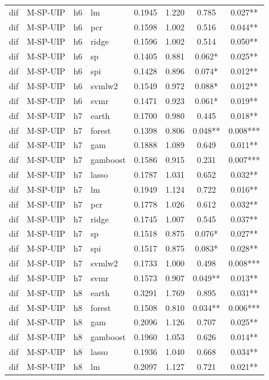 \begin{ThreePartTable}
\begin{longtable}[t]{llclcccc}
dif & M-SP-UIP & h6 & lm & 0.1945 & 1.220 & 0.785 & 0.027**\\
dif & M-SP-UIP & h6 & pcr & 0.1598 & 1.002 & 0.516 & 0.044**\\
dif & M-SP-UIP & h6 & ridge & 0.1596 & 1.002 & 0.514 & 0.050**\\
dif & M-SP-UIP & h6 & sp & 0.1405 & 0.881 & 0.062* & 0.025**\\
dif & M-SP-UIP & h6 & spi & 0.1428 & 0.896 & 0.074* & 0.012**\\
dif & M-SP-UIP & h6 & svmlw2 & 0.1549 & 0.972 & 0.088* & 0.012**\\
dif & M-SP-UIP & h6 & svmr & 0.1471 & 0.923 & 0.061* & 0.019**\\
\addlinespace
dif & M-SP-UIP & h7 & earth & 0.1700 & 0.980 & 0.445 & 0.018**\\
dif & M-SP-UIP & h7 & forest & 0.1398 & 0.806 & 0.048** & 0.008***\\
dif & M-SP-UIP & h7 & gam & 0.1888 & 1.089 & 0.649 & 0.011**\\
dif & M-SP-UIP & h7 & gamboost & 0.1586 & 0.915 & 0.231 & 0.007***\\
dif & M-SP-UIP & h7 & lasso & 0.1787 & 1.031 & 0.652 & 0.032**\\
dif & M-SP-UIP & h7 & lm & 0.1949 & 1.124 & 0.722 & 0.016**\\
dif & M-SP-UIP & h7 & pcr & 0.1778 & 1.026 & 0.612 & 0.032**\\
dif & M-SP-UIP & h7 & ridge & 0.1745 & 1.007 & 0.545 & 0.037**\\
dif & M-SP-UIP & h7 & sp & 0.1518 & 0.875 & 0.076* & 0.027**\\
dif & M-SP-UIP & h7 & spi & 0.1517 & 0.875 & 0.083* & 0.028**\\
dif & M-SP-UIP & h7 & svmlw2 & 0.1733 & 1.000 & 0.498 & 0.008***\\
dif & M-SP-UIP & h7 & svmr & 0.1573 & 0.907 & 0.049** & 0.013**\\
\addlinespace
dif & M-SP-UIP & h8 & earth & 0.3291 & 1.769 & 0.895 & 0.031**\\
dif & M-SP-UIP & h8 & forest & 0.1508 & 0.810 & 0.034** & 0.006***\\
dif & M-SP-UIP & h8 & gam & 0.2096 & 1.126 & 0.707 & 0.025**\\
dif & M-SP-UIP & h8 & gamboost & 0.1960 & 1.053 & 0.626 & 0.014**\\
dif & M-SP-UIP & h8 & lasso & 0.1936 & 1.040 & 0.668 & 0.034**\\
dif & M-SP-UIP & h8 & lm & 0.2097 & 1.127 & 0.721 & 0.021**\\

\end{longtable}
\end{ThreePartTable}
